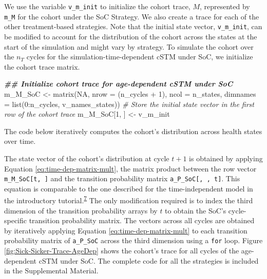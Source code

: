 \documentclass[
]{article}
\newenvironment{Shaded}{\begin{snugshade}}{\end{snugshade}}
\newcommand{\AttributeTok}[1]{\textcolor[rgb]{0.77,0.63,0.00}{#1}}
\newcommand{\CommentTok}[1]{\textcolor[rgb]{0.56,0.35,0.01}{\textit{#1}}}
\newcommand{\ConstantTok}[1]{\textcolor[rgb]{0.00,0.00,0.00}{#1}}
\newcommand{\DecValTok}[1]{\textcolor[rgb]{0.00,0.00,0.81}{#1}}
\newcommand{\DocumentationTok}[1]{\textcolor[rgb]{0.56,0.35,0.01}{\textbf{\textit{#1}}}}
\newcommand{\FunctionTok}[1]{\textcolor[rgb]{0.00,0.00,0.00}{#1}}
\newcommand{\NormalTok}[1]{#1}
\newcommand{\OtherTok}[1]{\textcolor[rgb]{0.56,0.35,0.01}{#1}}
\newcommand{\SpecialCharTok}[1]{\textcolor[rgb]{0.00,0.00,0.00}{#1}}
\begin{document}
We use the variable \texttt{v\_m\_init} to initialize the cohort trace, \(M\), represented by \texttt{m\_M} for the cohort under the SoC Strategy. We also create a trace for each of the other treatment-based strategies. Note that the initial state vector, \texttt{v\_m\_init}, can be modified to account for the distribution of the cohort across the states at the start of the simulation and might vary by strategy. To simulate the cohort over the \(n_T\) cycles for the simulation-time-dependent cSTM under SoC, we initialize the cohort trace matrix.

\begin{Shaded}
\begin{Highlighting}[]
\DocumentationTok{\#\# Initialize cohort trace for age{-}dependent cSTM under SoC}
\NormalTok{m\_M\_SoC }\OtherTok{\textless{}{-}} \FunctionTok{matrix}\NormalTok{(}\ConstantTok{NA}\NormalTok{, }
                 \AttributeTok{nrow =}\NormalTok{ (n\_cycles }\SpecialCharTok{+} \DecValTok{1}\NormalTok{), }\AttributeTok{ncol =}\NormalTok{ n\_states, }
                 \AttributeTok{dimnames =} \FunctionTok{list}\NormalTok{(}\DecValTok{0}\SpecialCharTok{:}\NormalTok{n\_cycles, v\_names\_states))}
\CommentTok{\# Store the initial state vector in the first row of the cohort trace}
\NormalTok{m\_M\_SoC[}\DecValTok{1}\NormalTok{, ] }\OtherTok{\textless{}{-}}\NormalTok{ v\_m\_init}
\end{Highlighting}
\end{Shaded}

The code below iteratively computes the cohort's distribution across health states over time.

The state vector of the cohort's distribution at cycle \(t+1\) is obtained by applying Equation \eqref{eq:time-dep-matrix-mult}, the matrix product between the row vector \texttt{m\_M\_SoC{[}t,\ {]}} and the transition probability matrix \texttt{a\_P\_SoC{[},\ ,\ t{]}}. This equation is comparable to the one described for the time-independent model in the introductory tutorial.\textsuperscript{\protect\hyperlink{ref-Alarid-Escudero2022b}{7}} The only modification required is to index the third dimension of the transition probability arrays by \(t\) to obtain the SoC's cycle-specific transition probability matrix. The vectors across all cycles are obtained by iteratively applying Equation \eqref{eq:time-dep-matrix-mult} to each transition probability matrix of \texttt{a\_P\_SoC} across the third dimension using a \texttt{for} loop. Figure \ref{fig:Sick-Sicker-Trace-AgeDep} shows the cohort's trace for all cycles of the age-dependent cSTM under SoC. The complete code for all the strategies is included in the Supplemental Material.
\end{document}
